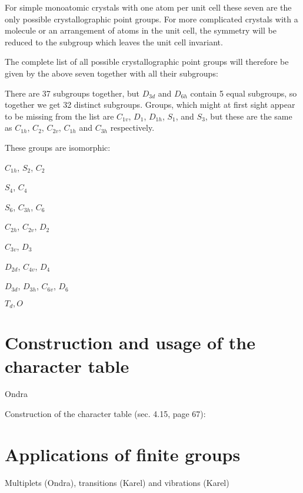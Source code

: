 For simple monoatomic crystals with one atom per unit cell these seven are the
only possible crystallographic point groups. For more complicated crystals with
a molecule or an arrangement of atoms in the unit cell, the symmetry will be
reduced to the subgroup which leaves the unit cell invariant.

The complete list of all possible crystallographic point groups will therefore
be given by the above seven together with all their subgroups:


There are 37 subgroups together, but $D_{3d}$ and $D_{6h}$ contain 5 equal
subgroups, so together we get 32 distinct subgroups. Groups, which might at
first sight appear to be missing from the list are $C_{1v}$, $D_1$, $D_{1h}$,
$S_1$, and $S_3$, but these are the same as $C_{1h}$, $C_2$, $C_{2v}$, $C_{1h}$
and $C_{3h}$ respectively.

These groups are isomorphic: 

$C_{1h}$, $S_2$, $C_2$

$S_4$, $C_4$

$S_6$, $C_{3h}$, $C_6$

$C_{2h}$, $C_{2v}$, $D_2$

$C_{3v}$, $D_3$

$D_{2d}$, $C_{4v}$, $D_4$

$D_{3d}$, $D_{3h}$, $C_{6v}$, $D_6$

$T_d, O$

\section{Construction and usage of the character table}

Ondra

Construction of the character table \cite{elliott} (sec. 4.15, page 67):

\section{Applications of finite groups}

Multiplets (Ondra), transitions (Karel) and vibrations (Karel)





